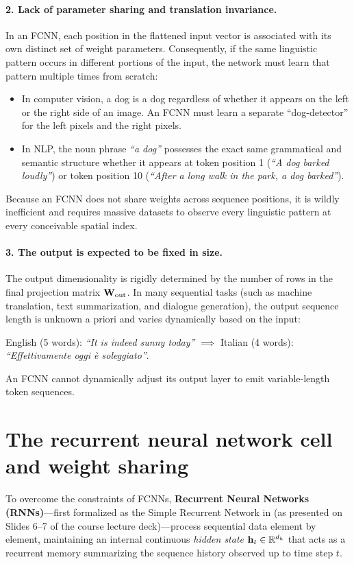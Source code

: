 \documentclass[../../main.tex]{subfiles}
\begin{document}
\paragraph{2. Lack of parameter sharing and translation invariance.}
In an FCNN, each position in the flattened input vector is associated with its own distinct set of weight parameters. Consequently, if the same linguistic pattern occurs in different portions of the input, the network must learn that pattern multiple times from scratch:
\begin{itemize}
    \item In computer vision, a dog is a dog regardless of whether it appears on the left or the right side of an image. An FCNN must learn a separate ``dog-detector'' for the left pixels and the right pixels.
    \item In NLP, the noun phrase \textit{``a dog''} possesses the exact same grammatical and semantic structure whether it appears at token position 1 (\textit{``A dog barked loudly''}) or token position 10 (\textit{``After a long walk in the park, a dog barked''}).
\end{itemize}
Because an FCNN does not share weights across sequence positions, it is wildly inefficient and requires massive datasets to observe every linguistic pattern at every conceivable spatial index.

\paragraph{3. The output is expected to be fixed in size.}
The output dimensionality is rigidly determined by the number of rows in the final projection matrix $\mathbf{W}_{\text{out}}$. In many sequential tasks (such as machine translation, text summarization, and dialogue generation), the output sequence length is unknown a priori and varies dynamically based on the input:
\begin{center}
English (5 words): \textit{``It is indeed sunny today''} $\implies$ Italian (4 words): \textit{``Effettivamente oggi \`e soleggiato''}.
\end{center}
An FCNN cannot dynamically adjust its output layer to emit variable-length token sequences.

\section{The recurrent neural network cell and weight sharing}
\label{sec:rnn_cell}

To overcome the constraints of FCNNs, \textbf{Recurrent Neural Networks (RNNs)}---first formalized as the Simple Recurrent Network in \cite{elman1990} (as presented on Slides 6--7 of the course lecture deck)---process sequential data element by element, maintaining an internal continuous \emph{hidden state} $\mathbf{h}_t \in \mathbb{R}^{d_h}$ that acts as a recurrent memory summarizing the sequence history observed up to time step $t$.
\end{document}
